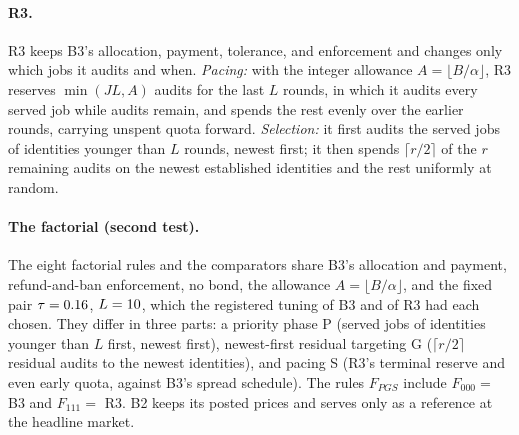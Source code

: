 \documentclass[11pt]{article}
\begin{document}
\paragraph{R3.} R3 keeps B3's allocation, payment, tolerance, and enforcement and changes only which jobs it audits and when. \emph{Pacing:} with the integer allowance $A = \lfloor B/\alpha \rfloor$, R3 reserves $\min(JL, A)$ audits for the last $L$ rounds, in which it audits every served job while audits remain, and spends the rest evenly over the earlier rounds, carrying unspent quota forward. \emph{Selection:} it first audits the served jobs of identities younger than $L$ rounds, newest first; it then spends $\lceil r/2 \rceil$ of the $r$ remaining audits on the newest established identities and the rest uniformly at random.

\paragraph{The factorial (second test).} The eight factorial rules and the comparators share B3's allocation and payment, refund-and-ban enforcement, no bond, the allowance $A = \lfloor B/\alpha \rfloor$, and the fixed pair $\tau = 0.16$, $L = 10$, which the registered tuning of B3 and of R3 had each chosen. They differ in three parts: a priority phase P (served jobs of identities younger than $L$ first, newest first), newest-first residual targeting G ($\lceil r/2 \rceil$ residual audits to the newest identities), and pacing S (R3's terminal reserve and even early quota, against B3's spread schedule). The rules $F_{PGS}$ include $F_{000} = $ B3 and $F_{111} = $ R3. B2 keeps its posted prices and serves only as a reference at the headline market.
\end{document}
